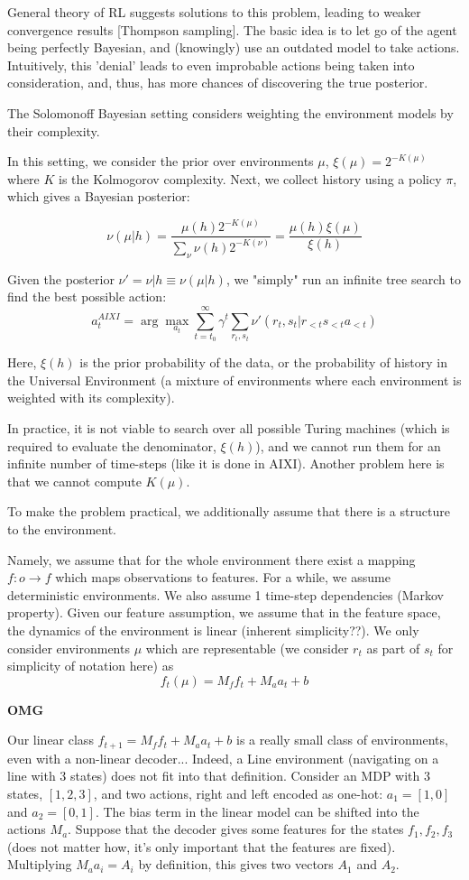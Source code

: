\documentclass[a4paper,11pt,oneside]{report}
\begin{document}
General theory of RL suggests solutions to this problem, leading to weaker convergence results [Thompson sampling]. The basic idea is to let go of the agent being perfectly Bayesian, and (knowingly) use an outdated model to take actions. Intuitively, this 'denial' leads to even improbable actions being taken into consideration, and, thus, has more chances of discovering the true posterior.

The Solomonoff Bayesian setting considers weighting the environment models by their complexity.

In this setting, we consider the prior over environments $\mu$, $\xi(\mu)=2^{-K(\mu)}$ where $K$ is the Kolmogorov complexity. Next, we collect history using a policy $\pi$, which gives a Bayesian posterior:

$$
\nu(\mu|h)=\frac{\mu(h)2^{-K(\mu)}}{\sum_{\nu}\nu(h)2^{-K(\nu)}}=\frac{\mu(h)\xi(\mu)}{\xi(h)}
$$

Given the posterior $\nu'=\nu|h\equiv \nu(\mu|h)$, we "simply" run an infinite tree search to find the best possible action:
$$
a_t^{AIXI}=\arg\max_{a_t}\sum\limits_{t=t_0}^{\infty}\gamma^t\sum_{r_t,s_t}\nu'(r_t,s_t|r_{<t}s_{<t}a_{<t})
$$

Here, $\xi(h)$ is the prior probability of the data, or the probability of history in the Universal Environment (a mixture of environments where each environment is weighted with its complexity).

In practice, it is not viable to search over all possible Turing machines (which is required to evaluate the denominator, $\xi(h)$), and we cannot run them for an infinite number of time-steps (like it is done in AIXI). Another problem here is that we cannot compute $K(\mu)$.

To make the problem practical, we additionally assume that there is a structure to the environment.

Namely, we assume that for the whole environment there exist a mapping $f\colon o\to f$ which maps observations to features. For a while, we assume deterministic environments. We also assume 1 time-step dependencies (Markov property). Given our feature assumption, we assume that in the feature space, the dynamics of the environment is linear (inherent simplicity??). We only consider environments $\mu$ which are representable (we consider $r_t$ as part of $s_t$ for simplicity of notation here) as
$$
f_t(\mu)=M_ff_t+M_aa_t+b
$$

{\bf OMG}

Our linear class $f_{t+1}=M_ff_t+M_aa_t+b$ is a really small class of environments, even with a non-linear decoder... Indeed, a Line environment (navigating on a line with 3 states) does not fit into that definition. Consider an MDP with 3 states, $[1, 2, 3]$, and two actions, right and left encoded as one-hot: $a_1=[1, 0]$ and $a_2=[0, 1]$. The bias term in the linear model can be shifted into the actions $M_a$. Suppose that the decoder gives some features for the states $f_1, f_2, f_3$ (does not matter how, it's only important that the features are fixed). Multiplying $M_aa_i=A_i$ by definition, this gives two vectors $A_1$ and $A_2$.
\end{document}
